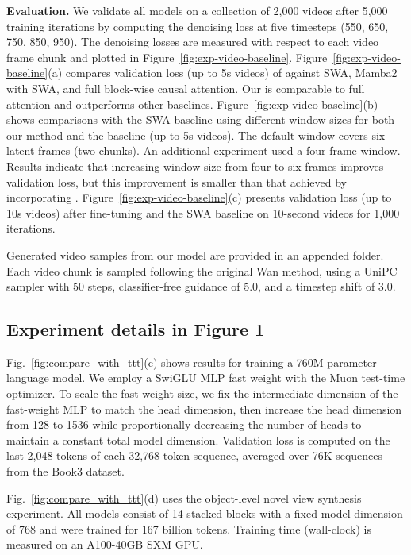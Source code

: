 \documentclass{article}
\begin{document}
\noindent\textbf{Evaluation.} We validate all models on a collection of 2,000 videos after 5,000 training iterations by computing the denoising loss at five timesteps (550, 650, 750, 850, 950). 
The denoising losses are measured with respect to each video frame chunk and plotted in Figure~\ref{fig:exp-video-baseline}. Figure~\ref{fig:exp-video-baseline}(a) compares validation loss (up to 5s videos) of \methodname{} against SWA, Mamba2 with SWA, and full block-wise causal attention. Our \methodname{} is comparable to full attention and outperforms other baselines. Figure~\ref{fig:exp-video-baseline}(b) shows comparisons with the SWA baseline using different window sizes for both our method and the baseline (up to 5s videos). The default window covers six latent frames (two chunks). An additional experiment used a four-frame window. Results indicate that increasing window size from four to six frames improves validation loss, but this improvement is smaller than that achieved by incorporating \methodname{}. 
Figure~\ref{fig:exp-video-baseline}(c) presents validation loss (up to 10s videos) after fine-tuning \methodname{} and the SWA baseline on 10-second videos for 1,000 iterations.

Generated video samples from our model are provided in an appended folder. Each video chunk is sampled following the original Wan method, using a UniPC~\cite{zhao2023unipc} sampler with 50 steps, classifier-free guidance of 5.0, and a timestep shift of 3.0. 

\subsection{Experiment details in Figure 1}
\label{sec:appen_figure_1_details}

Fig.~\ref{fig:compare_with_ttt}(c) shows results for training a 760M-parameter \methodname{} language model. We employ a SwiGLU MLP fast weight with the Muon test-time optimizer. To scale the fast weight size, we fix the intermediate dimension of the fast-weight MLP to match the head dimension, then increase the head dimension from 128 to 1536 while proportionally decreasing the number of heads to maintain a constant total model dimension. Validation loss is computed on the last 2,048 tokens of each 32,768-token sequence, averaged over 76K sequences from the Book3 dataset.

Fig.~\ref{fig:compare_with_ttt}(d) uses the object-level novel view synthesis experiment. All models consist of 14 stacked blocks with a fixed model dimension of 768 and were trained for 167 billion tokens. Training time (wall-clock) is measured on an A100-40GB SXM GPU.
\end{document}

